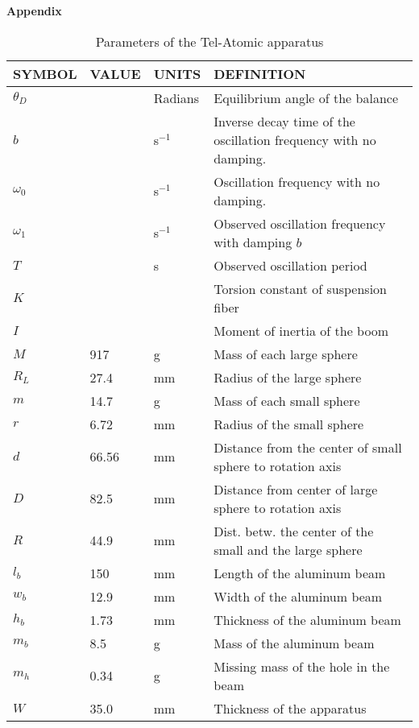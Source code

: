 \textbf{Appendix}
\begin{table}[H]
	\begin{tabular}{| l |l |l |l |}\hline
		SYMBOL & VALUE & UNITS & DEFINITION \\\hline
		\(\theta_{D}\) & & Radians & Equilibrium angle of the balance\\\hline
		\(b\) & & s\(^{-1}\) & Inverse decay time of the oscillation frequency with no damping. \\\hline
		\(\omega_{0}\) & & s\(^{-1}\) & Oscillation frequency with no damping. \\\hline
		\(\omega_{1}\) & & s\(^{-1}\) & Observed oscillation frequency with damping \(b\) \\\hline
		\(T\) & & s & Observed oscillation period \\\hline
		\(K\) & & & Torsion constant of suspension fiber \\\hline
		\(I\) & & & Moment of inertia of the boom \\\hline
		\(M\) & 917 & g & Mass of each large sphere \\\hline
		\(R_{L}\) & 27.4 & mm & Radius of the large sphere \\\hline
		\(m\) & 14.7 & g & Mass of each small sphere \\\hline
		\(r\)& 6.72 & mm & Radius of the small sphere \\\hline
		\(d\) & 66.56 & mm & Distance from the center of small sphere to rotation axis \\\hline
		\(D\) & 82.5 & mm & Distance from center of large sphere to rotation axis \\\hline
		\(R\) & 44.9 & mm & Dist. betw. the center of the small and the large sphere \\\hline
		\(l_{b}\) & 150 & mm & Length of the aluminum beam \\\hline
		\(w_{b}\) & 12.9 & mm & Width of the aluminum beam \\\hline
		\(h_{b}\) & 1.73 & mm & Thickness of the aluminum beam \\\hline 
		\(m_{b}\) & 8.5 & g & Mass of the aluminum beam \\\hline
		\(m_{h}\) & 0.34 & g & Missing mass of the hole in the beam \\\hline
		\(W\) & 35.0 & mm & Thickness of the apparatus \\\hline
		\end{tabular}
	\caption{Parameters of the Tel-Atomic apparatus}\label{tab:parameters}
	\end{table}

